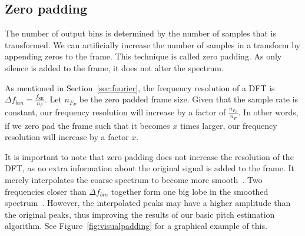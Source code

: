 \documentclass[10pt,twocolumn]{article}
\begin{document}
\subsection{Zero padding}  \label{sec:zeropadding}
The number of output bins is determined by the number of samples that is transformed. We can artificially increase the number of samples in a transform by appending zeros to the frame. This technique is called zero padding. As only silence is added to the frame, it does not alter the spectrum.

As mentioned in Section~\ref{sec:fourier}, the frequency resolution of a DFT is $\Delta f_{bin} = \frac{f_{\text{SR}}}{n_F}$. Let $n_{F_P}$ be the zero padded frame size. Given that the sample rate is constant, our frequency resolution will increase by a factor of $\frac{n_{F_P}}{n_F}$. In other words, if we zero pad the frame such that it becomes $x$ times larger, our frequency resolution will increase by a factor $x$.

It is important to note that zero padding does not increase the resolution of the DFT, as no extra information about the original signal is added to the frame. It merely interpolates the coarse spectrum to become more smooth~\cite{zeropad1}. Two frequencies closer than $\Delta f_{bin}$ together form one big lobe in the smoothed spectrum~\cite{zeropad2}. However, the interpolated peaks may have a higher amplitude than the original peaks, thus improving the results of our basic pitch estimation algorithm. See Figure~\ref{fig:visualpadding} for a graphical example of this.
\end{document}
